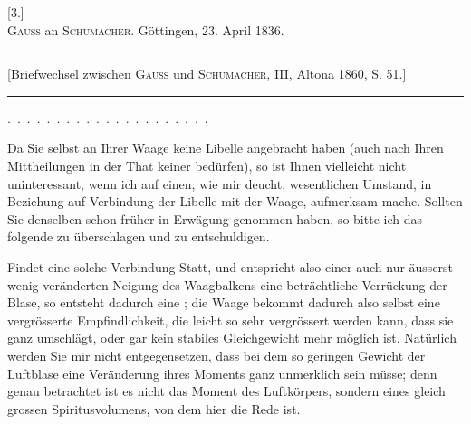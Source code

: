 \clearpage\begingroup{}
\begin{center}
[3.]\\[.7em]
\textsc{Gauss} an \textsc{Schumacher}. Göttingen, 23. April 1836.
\par\medskip\rule{.78\textwidth}{.35pt}\par
{\small [Briefwechsel zwischen \textsc{Gauss} und \textsc{Schumacher}, III, Altona 1860, S. 51.]}\par
\rule{.78\textwidth}{.35pt}
\end{center}
\noindent .\ .\ .\ .\ .\ .\ .\ .\ .\ .\ .\ .\ .\ .\ .\ .\ .\ .\ .\ .\ .
\par\noindent\hspace*{\parindent}Da Sie selbst an Ihrer Waage keine Libelle angebracht haben (auch
nach Ihren Mittheilungen in der That keiner bedürfen), so ist Ihnen vielleicht
nicht uninteressant, wenn ich auf einen, wie mir deucht, wesentlichen Umstand,
in Beziehung auf Verbindung der Libelle mit der Waage, aufmerksam
\clearpage{}
\noindent mache. Sollten Sie denselben schon früher in Erwägung genommen haben,
so bitte ich das folgende zu überschlagen und zu entschuldigen.

Findet eine solche Verbindung Statt, und entspricht also einer auch nur
äusserst wenig veränderten Neigung des Waagbalkens eine 
beträchtliche Verrückung der Blase, so entsteht dadurch eine ; die Waage bekommt dadurch also
selbst eine vergrösserte Empfindlichkeit, die leicht so sehr vergrössert werden
kann, dass sie ganz umschlägt, oder gar kein stabiles Gleichgewicht mehr
möglich ist. Natürlich werden Sie mir nicht entgegensetzen, dass bei dem
so geringen Gewicht der Luftblase eine Veränderung ihres Moments ganz
unmerklich sein müsse; denn genau betrachtet ist es nicht das Moment des
Luftkörpers, sondern eines gleich grossen Spiritusvolumens, von dem hier die
Rede ist.

